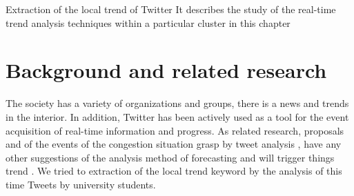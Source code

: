 \chapterhead
{Extraction of the local trend of Twitter}
{It describes the study of the real-time trend analysis techniques within a particular cluster in this chapter}


\section{Background and related research}
The society has a variety of organizations and groups, there is a news and trends in the interior. In addition, Twitter has been actively used as a tool for the event acquisition of real-time information and progress.
As related research, proposals and of the events of the congestion situation grasp by tweet analysis \cite{socialevent}, have any other suggestions of the analysis method of forecasting and will trigger things trend \cite{trendtrigger}.
We tried to extraction of the local trend keyword by the analysis of this time Tweets by university students.

